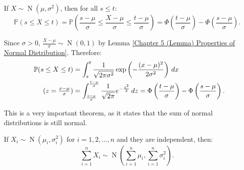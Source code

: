\documentclass{huhtakm-template-book-v2}
\newcommand{\prob}{\mathbb{P}}
\DeclareMathOperator{\N}{N}
\begin{document}
    \begin{lem}
        If $X \sim \N(\mu,\sigma^{2})$, then for all $s \leq t$:
        \begin{equation*}
            \prob(s \leq X \leq t) = \prob\left(\frac{s-\mu}{\sigma} \leq \frac{X-\mu}{\sigma} \leq \frac{t-\mu}{\sigma}\right) = \Phi\left(\frac{t-\mu}{\sigma}\right)-\Phi\left(\frac{s-\mu}{\sigma}\right).
        \end{equation*}
    \end{lem}
    \begin{proofing}
        Since $\sigma > 0$, $\frac{X-\mu}{\sigma} \sim \N(0,1)$ by Lemma \ref{Chapter 5 (Lemma) Properties of Normal Distribution}. Therefore:
        \begin{align*}
            \prob(s \leq X \leq t) &= \int_{s}^{t}\frac{1}{\sqrt{2\pi\sigma^{2}}}\exp\left(-\frac{(x-\mu)^{2}}{2\sigma^{2}}\right)\,dx\\
            \tag{$z = \frac{x-\mu}{\sigma}$}
            &= \int_{\frac{s-\mu}{\sigma}}^{\frac{t-\mu}{\sigma}}\frac{1}{\sqrt{2\pi}}e^{-\frac{z^{2}}{2}}\,dz = \Phi\left(\frac{t-\mu}{\sigma}\right)-\Phi\left(\frac{s-\mu}{\sigma}\right).
        \end{align*}
    \end{proofing}
    This is a very important theorem, as it states that the sum of normal distributions is still normal.
    \begin{thm}
        \label{Chapter 5 (Theorem) Additivity of Normal Distribution}
        If $X_{i} \sim \N(\mu_{i},\sigma_{i}^{2})$ for $i = 1,2,\dots,n$ and they are independent, then:
        \begin{equation*}
            \sum_{i = 1}^{n}X_{i} \sim \N\left(\sum_{i = 1}^{n}\mu_{i},\sum_{i = 1}^{n}\sigma_{i}^{2}\right).
        \end{equation*}
    \end{thm}
\end{document}
